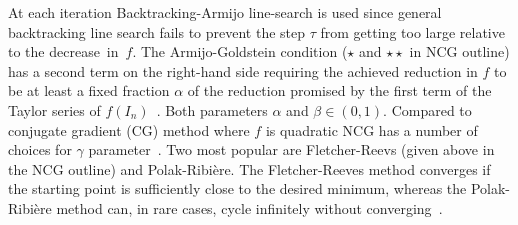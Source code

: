 \newpage

At each iteration Backtracking-Armijo line-search is used since general backtracking line search fails to prevent the step $\tau$ from getting too large relative to the decrease~in~$f$. 
The Armijo-Goldstein condition ($\star$  and $\star \star$ in NCG outline) has a second term on the right-hand side requiring the achieved reduction in $f$ to be at least a fixed fraction $\alpha$ of the reduction promised by the first term of the Taylor series of $f(I_n)$~\cite{Armijo:1966di}. 
Both parameters $\alpha$ and $\beta \in (0,1)$. 
Compared to conjugate gradient (CG) method where $f$ is quadratic NCG has a number of choices for $\gamma$ parameter~\cite{Hager:2006wp}. 
Two most popular  are Fletcher-Reevs (given above in the NCG outline) and Polak-Ribi\`ere. 
The Fletcher-Reeves method converges if the starting point is sufficiently close to the desired minimum, whereas the Polak-Ribi\`ere method can, in rare cases, cycle infinitely without converging~\cite{Shewchuk:1994uc}.
